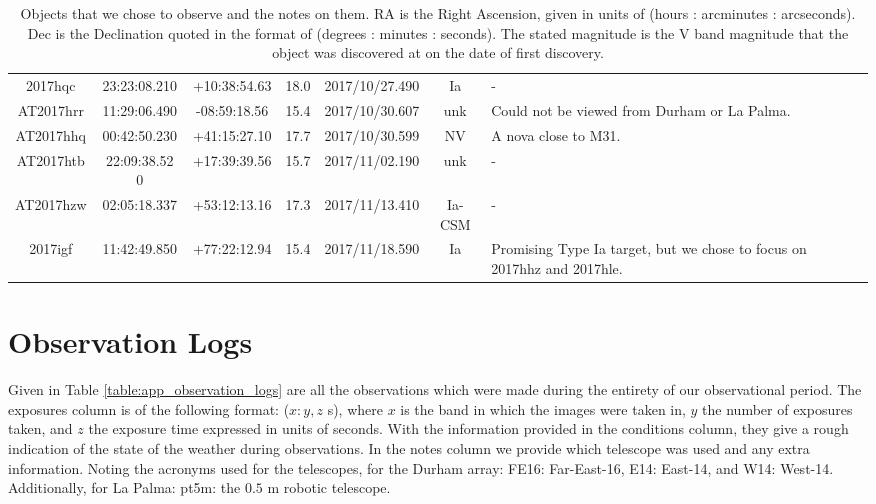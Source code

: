 \documentclass[twocolumn]{revtex4}
\begin{document}
{\begin{table}[h!]
\begin{tabularx}{\textwidth}{c c c c @{\hskip 5pt} c c X}
    2017hqc & 23:23:08.210 & +10:38:54.63 & 18.0 & 2017/10/27.490 & Ia & {-}  \\
    AT2017hrr & 11:29:06.490 & -08:59:18.56 & 15.4 & 2017/10/30.607 & unk & {Could not be viewed from Durham or La Palma. }  \\
    AT2017hhq & 00:42:50.230 & +41:15:27.10 & 17.7 & 2017/10/30.599 & NV & {A nova close to M31.}  \\
    AT2017htb & 22:09:38.52 0 & +17:39:39.56 & 15.7 & 2017/11/02.190 & unk & {-}  \\
    AT2017hzw & 02:05:18.337 & +53:12:13.16 & 17.3 & 2017/11/13.410 & Ia-CSM & {-}  \\
    2017igf & 11:42:49.850 & +77:22:12.94 & 15.4 & 2017/11/18.590 & Ia & {Promising Type Ia target, but we chose to focus on 2017hhz and 2017hle.}  \\
    \hline      
\end{tabularx}
\caption{Objects that we chose to observe and the notes on them. RA is the Right Ascension, given in units of (hours : arcminutes : arcseconds). Dec is the Declination quoted in the format of (degrees : minutes : seconds). The stated magnitude is the V band magnitude that the object was discovered at on the date of first discovery.}
\label{table:app_objects_log}
\end{table}


\clearpage

\onecolumngrid
\vspace{-3ex}
\section{Observation Logs} \label{app:observations_log}
\vspace{-2ex}
Given in Table \ref{table:app_observation_logs} are all the observations which were made during the entirety of our observational period. The exposures column is of the following format: ($x: y, z$ s), where $x$ is the band in which the images were taken in, $y$ the number of exposures taken, and $z$ the exposure time expressed in units of seconds. With the information provided in the conditions column, they give a rough indication of the state of the weather during observations. In the notes column we provide which telescope was used and any extra information. Noting the acronyms used for the telescopes, for the Durham array: FE16: Far-East-16, E14: East-14, and W14: West-14. Additionally, for La Palma: pt5m: the $0.5$ m robotic telescope.

}
\end{document}
